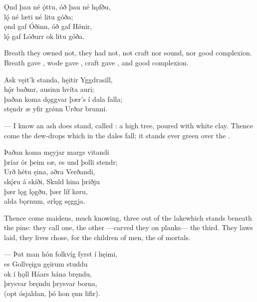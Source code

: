 \bva Ǫnd þau né ǫ́ttu, \hld óð þau né hǫfðu, \\%
lǫ́ né læti \hld né litu góða; \\%
ǫnd gaf Óðinn, \hld óð gaf Hǿnir, \\%
lǫ́ gaf Lóðurr \hld ok litu góða.\eva

\bvb Breath they owned not,  they had not, not craft nor sound, nor good complexion. Breath gave , wode gave , craft gave , and good complexion.\evb

\bva Ask vęit’k standa, \hld hęitir Yggdrasill, \\%
hǫ́r baðmr, ausinn \hld hvíta auri; \\%
þaðan koma dǫggvar \hld þær’s í dala falla; \\%
stęndr æ yfir grǿnn \hld Urðar brunni.\eva

\bvb — I know an ash does stand, called : a high tree, poured with white clay\footnotemark[1]. Thence come the dew-drops which in the dales fall; it stands ever green over the .\evb
{}

\bva Þaðan koma męyjar \hld margs vitandi \\%
þríar ór þeim sæ\footnotemark[1], \hld es und þolli stendr; \\%
Urð hétu ęina, \hld aðra Verðandi, \\%
skǫ́ru á skíði, \hld Skuld hina þriðju \\%
þær lǫg lǫgðu, \hld þær líf køru, \\%
alda bǫrnum, \hld ørlǫg sęggja.\eva
{}

\bvb Thence come maidens, much knowing, three out of the lake\footnotemark[1] which stands beneath the pine\footnotemark[2]:  they call one, the other —carved they on planks— the third. They laws laid, they lives chose, for the children of men, the  of mortals.\evb
{}


\bva — Þat man hón folkvíg \hld fyrst í hęimi, \\%
es Gollvęigu \hld gęirum studdu \\%
ok í hǫll Háars \hld hána bręndu, \\%
þrysvar bręndu \hld þrysvar borna, \\%
(opt ósjaldan, \hld þó hon ęnn lifir).\footnotemark[1]\eva
{}

